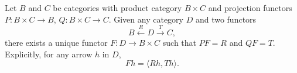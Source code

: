 Let $B$ and $C$ be categories with product category $B \times C$ and projection functors $P: B \times C \to B$, $Q: B \times C \to C$. Given any category $D$ and two functors
$$B \xleftarrow{R} D \xrightarrow{T} C,$$
there exists a unique functor $F: D \to B \times C$ such that $PF = R$ and $QF = T$. Explicitly, for any arrow $h$ in $D$,
$$Fh = \langle Rh, Th \rangle.$$
